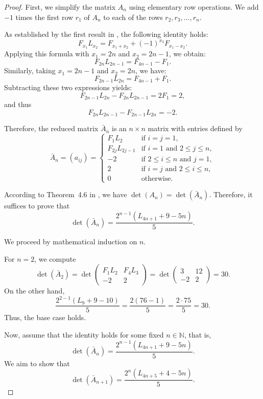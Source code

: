 \documentclass[11pt]{birkjour}
\theoremstyle{definition}
\theoremstyle{remark}
\numberwithin{equation}{section}
\begin{document}
\begin{proof}
First, we simplify the matrix $A_n$ using elementary row operations. We add $-1$ times the first row $r_1$ of $A_n$ to each of the rows $r_2, r_3, \ldots, r_n$.

As established by the first result in \cite{Ferns}, the following identity holds:
\[
F_{x_1}L_{x_2} = F_{x_1 + x_2} + (-1)^{x_2} F_{x_1 - x_2}.
\]
Applying this formula with $x_1 = 2n$ and $x_2 = 2n - 1$, we obtain:
\[
F_{2n}L_{2n-1} = F_{4n - 1} - F_1.
\]
Similarly, taking $x_1 = 2n - 1$ and $x_2 = 2n$, we have:
\[
F_{2n - 1}L_{2n} = F_{4n - 1} + F_1.
\]
Subtracting these two expressions yields:
\[
F_{2n - 1}L_{2n} - F_{2n}L_{2n - 1} = 2F_1 = 2,
\]
and thus
\[
F_{2n}L_{2n - 1} - F_{2n - 1}L_{2n} = -2.
\]

Therefore, the reduced matrix $\bar{A}_n$ is an $n \times n$ matrix with entries defined by
\[
\bar{A}_n = (a_{ij}) =
\begin{cases}
F_1 L_2 & \text{if } i = j = 1, \\
F_{2j} L_{2j - 1} & \text{if } i = 1 \text{ and } 2 \leq j \leq n, \\
-2 & \text{if } 2 \leq i \leq n \text{ and } j = 1, \\
2 & \text{if } i = j \text{ and } 2 \leq i \leq n, \\
0 & \text{otherwise}.
\end{cases}
\]

According to Theorem~4.6 in \cite{Friedberg}, we have $\det(A_n) = \det(\bar{A}_n)$. Therefore, it suffices to prove that
\[
\det(\bar{A}_n) = \frac{2^{n - 1}(L_{4n + 1} + 9 - 5n)}{5}.
\]

We proceed by mathematical induction on $n$.
\par\bigskip

For $n = 2$, we compute
\[
\det(\bar{A}_2) = \det \begin{pmatrix}
F_1 L_2 & F_4 L_3 \\
-2 & 2
\end{pmatrix}
= \det \begin{pmatrix}
3 & 12 \\
-2 & 2
\end{pmatrix} = 30.
\]
On the other hand,
\[
\frac{2^{2 - 1}(L_9 + 9 - 10)}{5} = \frac{2(76 - 1)}{5} = \frac{2 \cdot 75}{5} = 30.
\]
Thus, the base case holds.

Now, assume that the identity holds for some fixed $n \in \mathbb{N}$, that is,
\[
\det(\bar{A}_n) = \frac{2^{n - 1}(L_{4n + 1} + 9 - 5n)}{5}.
\]
We aim to show that
\[
\det(\bar{A}_{n+1}) = \frac{2^n(L_{4n + 5} + 4 - 5n)}{5}.
\]


\end{proof}
\end{document}
